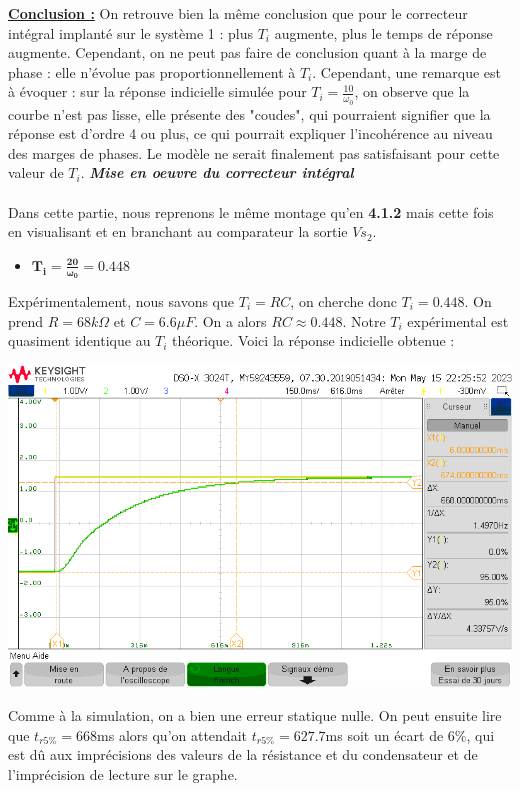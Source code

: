 \documentclass[12pt]{article}
\begin{document}
    \underline{\bf Conclusion :} On retrouve bien la même conclusion que pour le correcteur intégral implanté sur le système 1 : plus $T_i$ augmente, plus le temps de réponse augmente. Cependant, on ne peut pas faire de conclusion quant à la marge de phase : elle n'évolue pas proportionnellement à $T_i$. Cependant, une remarque est à évoquer : sur la réponse indicielle simulée pour $T_i = \frac{10}{\omega_0}$, on observe que la courbe n'est pas lisse, elle présente des "coudes", qui pourraient signifier que la réponse est d'ordre 4 ou plus, ce qui pourrait expliquer l'incohérence au niveau des marges de phases. Le modèle ne serait finalement pas satisfaisant pour cette valeur de $T_i$.
    \newpage\Large \textit{\textbf{Mise en oeuvre du correcteur intégral}}
\\\\\normalsize Dans cette partie, nous reprenons le même montage qu'en \textbf{4.1.2} mais cette fois en visualisant et en branchant au comparateur la sortie $Vs_2$.
\begin{itemize}
    \item \large $\mathbf{T_i = \frac{20}{\omega_0} = 0.448}$
\end{itemize}
Expérimentalement, nous savons que $T_i = RC$, on cherche donc $T_i = 0.448$. On prend $R = 68 k\Omega$ et $C = 6.6 \mu F$. On a alors $RC \approx 0.448$. Notre $T_i$ expérimental est quasiment identique au $T_i$ théorique.
Voici la réponse indicielle obtenue : 
\begin{center}
    \includegraphics[width = 16 cm]{TP3/Syst_2/I/tr5-syst2-ti=20surw0.png}
\end{center} 
Comme à la simulation, on a bien une erreur statique nulle. On peut ensuite lire que $t_{r5\%} = 668$ms alors qu'on attendait $t_{r5\%} = 627.7$ms soit un écart de 6$\%$, qui est dû aux imprécisions des valeurs de la résistance et du condensateur et de l'imprécision de lecture sur le graphe.
\end{document}
